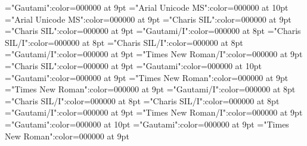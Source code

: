 \documentclass[gps1,twoside]{article}
\begin{document}
\font\spantexitemteLexSensepublishStemGlossPubLdtesensespanentryletDatadicBody="Gautami":color=000000 at 9pt
\font\xitemhiLexSensepublishStemGlossPubLdtesensespanentryletDatadicBody="Arial Unicode MS":color=000000 at 10pt
\font\spanhixitemhiLexSensepublishStemGlossPubLdtesensespanentryletDatadicBody="Arial Unicode MS":color=000000 at 9pt
\font\spansensespanentryletDatadicBody="Charis SIL":color=000000 at 9pt
\font\spanspansensespanentryletDatadicBody="Charis SIL":color=000000 at 9pt
\font\exampleggoTeluINspanspansensespanentryletDatadicBody="Gautami/I":color=000000 at 8pt
\font\examplebeforespanspansensespanentryletDatadicBody="Charis SIL/I":color=000000 at 8pt
\font\exampleafterspanspansensespanentryletDatadicBody="Charis SIL/I":color=000000 at 8pt
\font\spanggoTeluINexampleggoTeluINspanspansensespanentryletDatadicBody="Gautami/I":color=000000 at 9pt
\font\spanenexampleggoTeluINspanspansensespanentryletDatadicBody="Times New Roman/I":color=000000 at 9pt
\font\spanspanspansensespanentryletDatadicBody="Charis SIL":color=000000 at 9pt
\font\translationLdtespanspanspansensespanentryletDatadicBody="Gautami":color=000000 at 10pt
\font\spantetranslationLdtespanspanspansensespanentryletDatadicBody="Gautami":color=000000 at 9pt
\font\spanentranslationLdtespanspanspansensespanentryletDatadicBody="Times New Roman":color=000000 at 9pt
\font\spanenspansensespanentryletDatadicBody="Times New Roman":color=000000 at 9pt
\font\exampleggoTeluINspansensespanentryletDatadicBody="Gautami/I":color=000000 at 8pt
\font\examplebeforespansensespanentryletDatadicBody="Charis SIL/I":color=000000 at 8pt
\font\exampleafterspansensespanentryletDatadicBody="Charis SIL/I":color=000000 at 8pt
\font\spanggoTeluINexampleggoTeluINspansensespanentryletDatadicBody="Gautami/I":color=000000 at 9pt
\font\spanenexampleggoTeluINspansensespanentryletDatadicBody="Times New Roman/I":color=000000 at 9pt
\font\translationLdtespanspansensespanentryletDatadicBody="Gautami":color=000000 at 10pt
\font\spantetranslationLdtespanspansensespanentryletDatadicBody="Gautami":color=000000 at 9pt
\font\spanentranslationLdtespanspansensespanentryletDatadicBody="Times New Roman":color=000000 at 9pt
\end{document}
